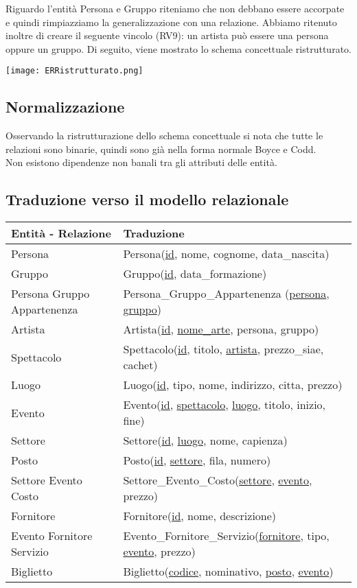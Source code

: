 \documentclass[a4paper,11pt]{article}
\begin{document}
Riguardo l'entità Persona e Gruppo riteniamo che non debbano essere accorpate e quindi rimpiazziamo la generalizzazione con una relazione.
Abbiamo ritenuto inoltre di creare il seguente vincolo (RV9): un artista può essere una persona oppure un gruppo.
Di seguito, viene mostrato lo schema concettuale ristrutturato.

\texttt{[image: ERRistrutturato.png]}

\subsection{Normalizzazione}

Osservando la ristrutturazione dello schema concettuale si nota che tutte le relazioni sono binarie, quindi sono già nella forma normale Boyce e Codd.\\
Non esistono dipendenze non banali tra gli attributi delle entità.

\subsection{Traduzione verso il modello relazionale}
\begin{tabularx}{\textwidth}{|X|>{\raggedright\arraybackslash}X|}
\hline
  \textbf{Entità - Relazione} & \textbf{Traduzione}\\
\hline
  Persona & Persona(\underline{id}, nome, cognome, data\_nascita) \\
\hline
  Gruppo & Gruppo(\underline{id}, data\_formazione) \\
\hline
  Persona Gruppo Appartenenza & Persona\_Gruppo\_Appartenenza (\underline{persona}, \underline{gruppo}) \\
\hline
  Artista & Artista(\underline{id}, \underline{nome\_arte}, persona, gruppo) \\
\hline
  Spettacolo & Spettacolo(\underline{id}, titolo, \underline{artista}, prezzo\_siae, cachet) \\
\hline
  Luogo & Luogo(\underline{id}, tipo, nome, indirizzo, citta, prezzo) \\
\hline
  Evento & Evento(\underline{id}, \underline{spettacolo}, \underline{luogo}, titolo, inizio, fine) \\
\hline
  Settore & Settore(\underline{id}, \underline{luogo}, nome, capienza) \\
\hline
  Posto & Posto(\underline{id}, \underline{settore}, fila, numero) \\
\hline
  Settore Evento Costo & Settore\_Evento\_Costo(\underline{settore}, \underline{evento}, prezzo) \\
\hline
  Fornitore & Fornitore(\underline{id}, nome, descrizione) \\
\hline
  Evento Fornitore Servizio & Evento\_Fornitore\_Servizio(\underline{fornitore}, tipo, \underline{evento}, prezzo) \\
\hline
  Biglietto & Biglietto(\underline{codice}, nominativo, \underline{posto}, \underline{evento}) \\
\hline
\end{tabularx}
\end{document}
